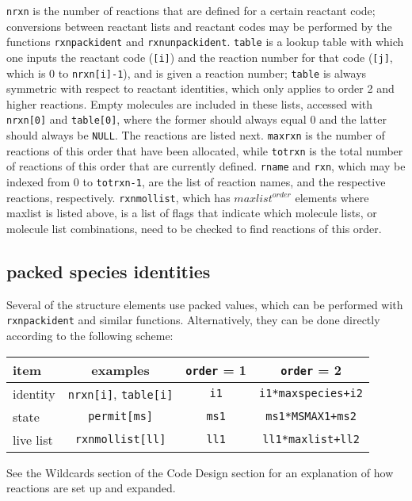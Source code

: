 \documentclass {book}
\begin{document}
\texttt{nrxn} is the number of reactions that are defined for a certain reactant code; conversions between reactant lists and reactant codes may be performed by the functions \texttt{rxnpackident} and \texttt{rxnunpackident}.  \texttt{table} is a lookup table with which one inputs the reactant code (\texttt{[i]}) and the reaction number for that code (\texttt{[j]}, which is 0 to \texttt{nrxn[i]-1}), and is given a reaction number; \texttt{table} is always symmetric with respect to reactant identities, which only applies to order 2 and higher reactions.  Empty molecules are included in these lists, accessed with \texttt{nrxn[0]} and \texttt{table[0]}, where the former should always equal 0 and the latter should always be \texttt{NULL}.  The reactions are listed next.  \texttt{maxrxn} is the number of reactions of this order that have been allocated, while \texttt{totrxn} is the total number of reactions of this order that are currently defined.  \texttt{rname} and \texttt{rxn}, which may be indexed from 0 to \texttt{totrxn-1}, are the list of reaction names, and the respective reactions, respectively.  \texttt{rxnmollist}, which has $maxlist^{order}$ elements where maxlist is listed above, is a list of flags that indicate which molecule lists, or molecule list combinations, need to be checked to find reactions of this order.

\subsection*{packed species identities}

Several of the structure elements use packed values, which can be performed with \texttt{rxnpackident} and similar functions.  Alternatively, they can be done directly according to the following scheme:

\begin{longtable}[c]{lccc}
item & examples & \texttt{order} = 1 & \texttt{order} = 2\\
\hline
identity & \texttt{nrxn[i]}, \texttt{table[i]} & \texttt{i1} & \texttt{i1*maxspecies+i2}\\
state & \texttt{permit[ms]} & \texttt{ms1} & \texttt{ms1*MSMAX1+ms2}\\
live list & \texttt{rxnmollist[ll]} & \texttt{ll1} & \texttt{ll1*maxlist+ll2}\\
\end{longtable}

See the Wildcards section of the Code Design section for an explanation of how reactions are set up and expanded.
\end{document}
